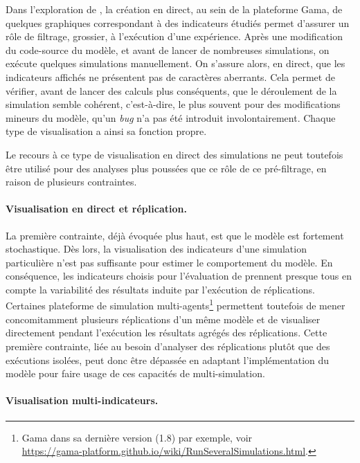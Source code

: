 Dans l'exploration de \simfeodal{}, la création en direct, au sein de la plateforme Gama, de quelques graphiques correspondant à des indicateurs étudiés permet d'assurer un rôle de filtrage, grossier, à l'exécution d'une expérience.
Après une modification du code-source du modèle, et avant de lancer de nombreuses simulations, on exécute quelques simulations \og manuellement\fg{}.
On s'assure alors, en direct, que les indicateurs affichés ne présentent pas de caractères aberrants.
Cela permet de vérifier, avant de lancer des calculs plus conséquents, que le déroulement de la simulation semble cohérent, c'est-à-dire, le plus souvent pour des modifications mineurs du modèle, qu'un \textit{bug} n'a pas été introduit involontairement.
Chaque type de visualisation a ainsi sa fonction propre.

Le recours à ce type de visualisation en direct des simulations ne peut toutefois être utilisé pour des analyses plus poussées que ce rôle de ce pré-filtrage, en raison de plusieurs contraintes.

\paragraph{Visualisation en direct et réplication.}

La première contrainte, déjà évoquée plus haut, est que le modèle \simfeodal{} est fortement stochastique.
Dès lors, la visualisation des indicateurs d'une simulation particulière n'est pas suffisante pour estimer le comportement du modèle.
En conséquence, les indicateurs choisis pour l'évaluation de \simfeodal{} prennent presque tous en compte la variabilité des résultats induite par l'exécution de réplications.
Certaines plateforme de simulation multi-agents\footnote{
	Gama dans sa dernière version (1.8) par exemple, voir\\ \href{https://gama-platform.github.io/wiki/RunSeveralSimulations.html}{https://gama-platform.github.io/wiki/RunSeveralSimulations.html}.
} permettent toutefois de mener concomitamment plusieurs réplications d'un même modèle et de visualiser directement pendant l'exécution les résultats agrégés des réplications.
Cette première contrainte, liée au besoin d'analyser des réplications plutôt que des exécutions isolées, peut donc être dépassée en adaptant l'implémentation du modèle pour faire usage de ces capacités de multi-simulation.

\paragraph{Visualisation multi-indicateurs.}


